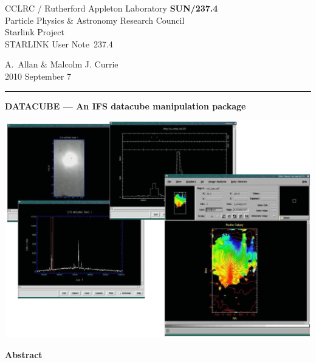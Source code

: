 \documentclass[twoside,11pt]{article}
\newcommand{\stardoccategory}  {STARLINK User Note}
\newcommand{\stardocinitials}  {SUN}
\newcommand{\stardocnumber}    {237.4}
\newcommand{\stardocauthors}   {A.~Allan \& Malcolm J. Currie}
\newcommand{\stardocdate}      {2010 September 7}
\newcommand{\stardoctitle}     {DATACUBE --- An IFS datacube manipulation package}
\newcommand{\stardocname}{\stardocinitials /\stardocnumber}
\newenvironment{latexonly}{}{}
\renewcommand{\_}{\texttt{\symbol{95}}}
\begin{document}
\thispagestyle{empty}

\begin{latexonly}
   CCLRC / {\sc Rutherford Appleton Laboratory} \hfill {\bf \stardocname}\\
   {\large Particle Physics \& Astronomy Research Council}\\
   {\large Starlink Project\\}
   {\large \stardoccategory\ \stardocnumber}
   \begin{flushright}
   \stardocauthors\\
   \stardocdate
   \end{flushright}
   \vspace{-4mm}
   \rule{\textwidth}{0.5mm}
   \vspace{5mm}
   \begin{center}
   {\Huge\bf  \stardoctitle \\ [2.5ex]}
   \end{center}
   \vspace{5mm}

   \begin{center}
   \includegraphics[scale=0.6]{sun237_cover.eps}
   \end{center}

   \vspace{5mm}
   \begin{center}
      {\Large\bf Abstract}
   \end{center}
\end{latexonly}
\end{document}
